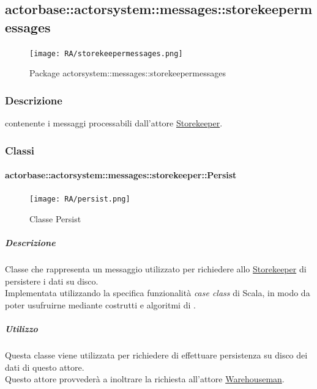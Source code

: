 \documentclass{scalatekids-article}
\begin{document}

\subsection{actorbase::actorsystem::messages::storekeepermessages}
\label{sec:actorbase::actorsystem::messages::storekeepermessages}

\begin{figure}[H]
  \begin{center}
    \texttt{[image: RA/storekeepermessages.png]}
    \caption{Package actorsystem::messages::storekeepermessages}
  \end{center}
\end{figure}

\subsubsection{Descrizione}
 contenente i messaggi processabili dall'attore \hyperref[sec:actorbase::actorsystem::actors::storekeeper::Storekeeper]{Storekeeper}.

\subsubsection{Classi}

\paragraph{actorbase::actorsystem::messages::storekeeper::Persist}
\label{sec:actorbase::actorsystem::messages::storekeeper::Persist}

\begin{figure}[H]
  \begin{center}
    \texttt{[image: RA/persist.png]}
    \caption{Classe Persist}
  \end{center}
\end{figure}

\subparagraph{Descrizione}
Classe che rappresenta un messaggio utilizzato per richiedere allo
\hyperref[sec:actorbase::actorsystem::actors::storekeeper::Storekeeper]{Storekeeper} di persistere i dati su disco.\\Implementata utilizzando la specifica funzionalità \textit{case class} di Scala,
in modo da poter usufruirne mediante costrutti e algoritmi di
.

\subparagraph{Utilizzo}
Questa classe viene utilizzata per richiedere di effettuare persistenza su disco dei dati di questo attore.\\Questo attore provvederà a inoltrare la richiesta
all'attore \hyperref[sec:actorbase::actorsystem::actors::warehouseman::Warehouseman]{Warehouseman}.
\end{document}
